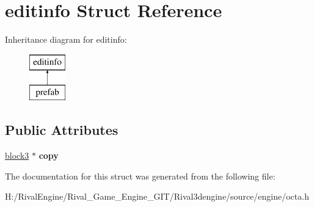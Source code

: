 \hypertarget{structeditinfo}{}\section{editinfo Struct Reference}
\label{structeditinfo}
Inheritance diagram for editinfo\+:\begin{figure}[H]
\begin{center}
\leavevmode
\includegraphics[height=2.000000cm]{structeditinfo}
\end{center}
\end{figure}
\subsection*{Public Attributes}
\begin{DoxyCompactItemize}
\item 
\mbox{\label{structeditinfo_aa289d6d9d860f4d343a0ef6645ed3cb6}} 
\hyperlink{structblock3}{block3} $\ast$ {\bfseries copy}
\end{DoxyCompactItemize}


The documentation for this struct was generated from the following file\+:\begin{DoxyCompactItemize}
\item 
H\+:/\+Rival\+Engine/\+Rival\+\_\+\+Game\+\_\+\+Engine\+\_\+\+G\+I\+T/\+Rival3dengine/source/engine/octa.\+h\end{DoxyCompactItemize}

